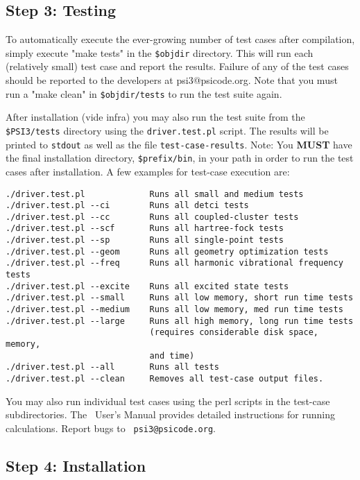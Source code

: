 \documentclass[12pt]{article}
\begin{document}
\subsection{Step 3: Testing}

To automatically execute the ever-growing number of test cases after
compilation, simply execute "make tests" in the {\tt \$objdir} directory.
This will run each (relatively small) test case and report the results.
Failure of any of the test cases should be reported to the developers at
psi3@psicode.org.  Note that you must run a "make clean" in 
{\tt \$objdir/tests} to run the test suite again.

After installation (vide infra) you may also run the test suite from the {\tt
\$PSI3/tests} directory using the {\tt driver.test.pl} script.  The results
will be printed to {\tt stdout} as well as the file {\tt test-case-results}.
Note: You {\bf MUST} have the final installation directory, {\tt \$prefix/bin},
in your path in order to run the test cases after installation.  A few
examples for test-case execution are:
\noindent 
\begin{verbatim}
./driver.test.pl             Runs all small and medium tests
./driver.test.pl --ci        Runs all detci tests
./driver.test.pl --cc        Runs all coupled-cluster tests
./driver.test.pl --scf       Runs all hartree-fock tests
./driver.test.pl --sp        Runs all single-point tests
./driver.test.pl --geom      Runs all geometry optimization tests
./driver.test.pl --freq      Runs all harmonic vibrational frequency tests
./driver.test.pl --excite    Runs all excited state tests
./driver.test.pl --small     Runs all low memory, short run time tests
./driver.test.pl --medium    Runs all low memory, med run time tests
./driver.test.pl --large     Runs all high memory, long run time tests
                             (requires considerable disk space, memory, 
                             and time)
./driver.test.pl --all       Runs all tests
./driver.test.pl --clean     Removes all test-case output files.
\end{verbatim} 

You may also run individual test cases using the perl scripts in
the test-case subdirectories.  The \PSIthree\ User's Manual provides
detailed instructions for running calculations. Report bugs to {\tt
psi3@psicode.org}.

\subsection{Step 4: Installation}
\end{document}
